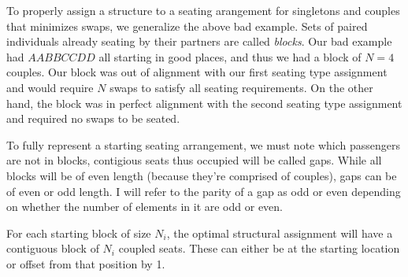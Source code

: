 To properly assign a structure to a seating arangement for singletons and couples that minimizes swaps, we generalize the above bad example.  Sets of paired individuals already seating by their partners are called {\it blocks}.  Our bad example had $AABBCCDD$ all starting in good places, and thus we had a block of $N = 4$ couples.  Our block was out of alignment with our first seating type assignment and would require $N$ swaps to satisfy all seating requirements.  On the other hand, the block was in perfect alignment with the second seating type assignment and required no swaps to be seated.

\begin{figure}[H]
\centering
{}
\end{figure}

To fully represent a starting seating arrangement, we must note which passengers are not in blocks, contigious seats thus occupied will be called gaps.  While all blocks will be of even length (because they're comprised of couples), gaps can be of even or odd length.  I will refer to the parity of a gap as odd or even depending on whether the number of elements in it are odd or even.

\begin{lem} \label{lemma:ParityOnly}
For each starting block of size $N_i$, the optimal structural assignment will have a contiguous block of $N_i$ coupled seats. These can either be at the starting location or offset from that position by 1.
\end{lem}

